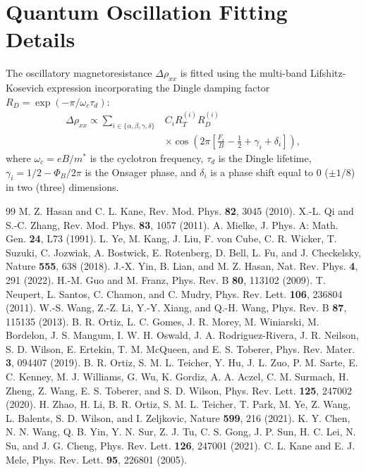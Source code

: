 \documentclass[aps,prb,reprint,superscriptaddress,amsmath,amssymb,citeautoscript]{revtex4-2}
\begin{document}
\appendix
\section{Quantum Oscillation Fitting Details}
The oscillatory magnetoresistance $\Delta \rho_{xx}$ is fitted using the multi-band Lifshitz-Kosevich expression incorporating the Dingle damping factor $R_D = \exp(-\pi / \omega_c \tau_d)$:
\begin{align}
\Delta \rho_{xx} \propto \sum_{i \in \{\alpha,\beta,\gamma,\delta\}} & C_i R_T^{(i)} R_D^{(i)} \nonumber \\
& \times \cos\left( 2\pi \left[ \frac{F_i}{B} - \frac{1}{2} + \gamma_i + \delta_i \right] \right),
\label{eq:lk_full}
\end{align}
where $\omega_c = eB/m^*$ is the cyclotron frequency, $\tau_d$ is the Dingle lifetime, $\gamma_i = 1/2 - \Phi_B / 2\pi$ is the Onsager phase, and $\delta_i$ is a phase shift equal to $0$ ($ \pm 1/8$) in two (three) dimensions.

\begin{thebibliography}{99}
 M. Z. Hasan and C. L. Kane, Rev. Mod. Phys. \textbf{82}, 3045 (2010).
 X.-L. Qi and S.-C. Zhang, Rev. Mod. Phys. \textbf{83}, 1057 (2011).
 A. Mielke, J. Phys. A: Math. Gen. \textbf{24}, L73 (1991).
 L. Ye, M. Kang, J. Liu, F. von Cube, C. R. Wicker, T. Suzuki, C. Jozwiak, A. Bostwick, E. Rotenberg, D. Bell, L. Fu, and J. Checkelsky, Nature \textbf{555}, 638 (2018).
 J.-X. Yin, B. Lian, and M. Z. Hasan, Nat. Rev. Phys. \textbf{4}, 291 (2022).
 H.-M. Guo and M. Franz, Phys. Rev. B \textbf{80}, 113102 (2009).
 T. Neupert, L. Santos, C. Chamon, and C. Mudry, Phys. Rev. Lett. \textbf{106}, 236804 (2011).
 W.-S. Wang, Z.-Z. Li, Y.-Y. Xiang, and Q.-H. Wang, Phys. Rev. B \textbf{87}, 115135 (2013).
 B. R. Ortiz, L. C. Gomes, J. R. Morey, M. Winiarski, M. Bordelon, J. S. Mangum, I. W. H. Oswald, J. A. Rodriguez-Rivera, J. R. Neilson, S. D. Wilson, E. Ertekin, T. M. McQueen, and E. S. Toberer, Phys. Rev. Mater. \textbf{3}, 094407 (2019).
 B. R. Ortiz, S. M. L. Teicher, Y. Hu, J. L. Zuo, P. M. Sarte, E. C. Kenney, M. J. Williams, G. Wu, K. Gordiz, A. A. Aczel, C. M. Surmach, H. Zheng, Z. Wang, E. S. Toberer, and S. D. Wilson, Phys. Rev. Lett. \textbf{125}, 247002 (2020).
 H. Zhao, H. Li, B. R. Ortiz, S. M. L. Teicher, T. Park, M. Ye, Z. Wang, L. Balents, S. D. Wilson, and I. Zeljkovic, Nature \textbf{599}, 216 (2021).
 K. Y. Chen, N. N. Wang, Q. B. Yin, Y. N. Sur, Z. J. Tu, C. S. Gong, J. P. Sun, H. C. Lei, N. Su, and J. G. Cheng, Phys. Rev. Lett. \textbf{126}, 247001 (2021).
 C. L. Kane and E. J. Mele, Phys. Rev. Lett. \textbf{95}, 226801 (2005).
\end{thebibliography}
\end{document}
